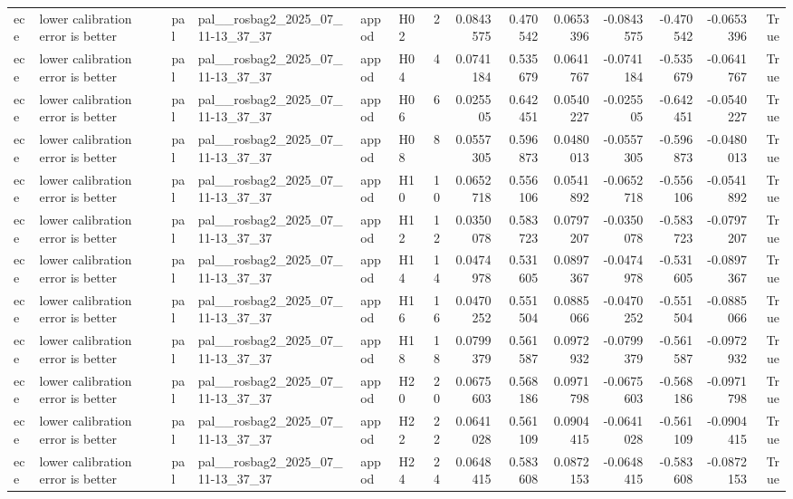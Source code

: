 \begin{longtable}{llllllrrrrrrrr}
ece & lower calibration error is better & pal & pal\_\_rosbag2\_2025\_07\_11-13\_37\_37 & appod & H02 & 2 & 0.0843575 & 0.470542 & 0.0653396 & -0.0843575 & -0.470542 & -0.0653396 & True \\
ece & lower calibration error is better & pal & pal\_\_rosbag2\_2025\_07\_11-13\_37\_37 & appod & H04 & 4 & 0.0741184 & 0.535679 & 0.0641767 & -0.0741184 & -0.535679 & -0.0641767 & True \\
ece & lower calibration error is better & pal & pal\_\_rosbag2\_2025\_07\_11-13\_37\_37 & appod & H06 & 6 & 0.025505 & 0.642451 & 0.0540227 & -0.025505 & -0.642451 & -0.0540227 & True \\
ece & lower calibration error is better & pal & pal\_\_rosbag2\_2025\_07\_11-13\_37\_37 & appod & H08 & 8 & 0.0557305 & 0.596873 & 0.0480013 & -0.0557305 & -0.596873 & -0.0480013 & True \\
ece & lower calibration error is better & pal & pal\_\_rosbag2\_2025\_07\_11-13\_37\_37 & appod & H10 & 10 & 0.0652718 & 0.556106 & 0.0541892 & -0.0652718 & -0.556106 & -0.0541892 & True \\
ece & lower calibration error is better & pal & pal\_\_rosbag2\_2025\_07\_11-13\_37\_37 & appod & H12 & 12 & 0.0350078 & 0.583723 & 0.0797207 & -0.0350078 & -0.583723 & -0.0797207 & True \\
ece & lower calibration error is better & pal & pal\_\_rosbag2\_2025\_07\_11-13\_37\_37 & appod & H14 & 14 & 0.0474978 & 0.531605 & 0.0897367 & -0.0474978 & -0.531605 & -0.0897367 & True \\
ece & lower calibration error is better & pal & pal\_\_rosbag2\_2025\_07\_11-13\_37\_37 & appod & H16 & 16 & 0.0470252 & 0.551504 & 0.0885066 & -0.0470252 & -0.551504 & -0.0885066 & True \\
ece & lower calibration error is better & pal & pal\_\_rosbag2\_2025\_07\_11-13\_37\_37 & appod & H18 & 18 & 0.0799379 & 0.561587 & 0.0972932 & -0.0799379 & -0.561587 & -0.0972932 & True \\
ece & lower calibration error is better & pal & pal\_\_rosbag2\_2025\_07\_11-13\_37\_37 & appod & H20 & 20 & 0.0675603 & 0.568186 & 0.0971798 & -0.0675603 & -0.568186 & -0.0971798 & True \\
ece & lower calibration error is better & pal & pal\_\_rosbag2\_2025\_07\_11-13\_37\_37 & appod & H22 & 22 & 0.0641028 & 0.561109 & 0.0904415 & -0.0641028 & -0.561109 & -0.0904415 & True \\
ece & lower calibration error is better & pal & pal\_\_rosbag2\_2025\_07\_11-13\_37\_37 & appod & H24 & 24 & 0.0648415 & 0.583608 & 0.0872153 & -0.0648415 & -0.583608 & -0.0872153 & True \\

\end{longtable}
